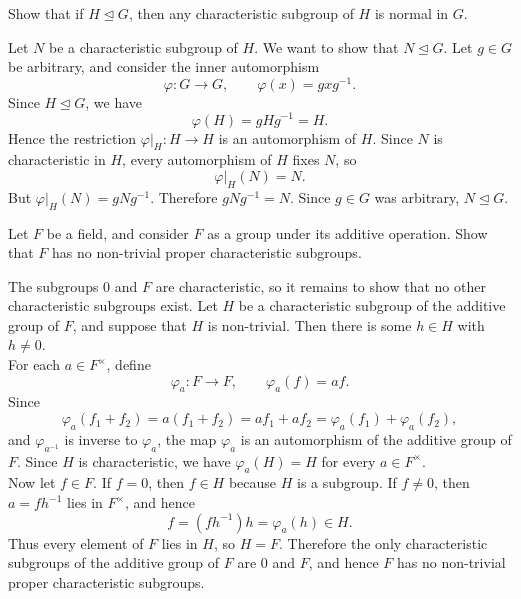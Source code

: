 \documentclass[../Odyssey_Project.tex]{subfiles}
\begin{document}
\begin{exercise}
\label{ex:2.4}
Show that if $H \trianglelefteq G$, then any characteristic subgroup of $H$ is normal in $G$.
\end{exercise}
\begin{solution}
    Let $N$ be a characteristic subgroup of $H$. We want to show that $N \trianglelefteq G$. Let $g \in G$ be arbitrary, and consider the inner automorphism
    \[
        \varphi \colon G \to G,
        \qquad
        \varphi(x) = gxg^{-1}.
    \]
    Since $H \trianglelefteq G$, we have
    \[
        \varphi(H) = gHg^{-1} = H.
    \]
    Hence the restriction $\varphi|_H \colon H \to H$ is an automorphism of $H$. Since $N$ is characteristic in $H$, every automorphism of $H$ fixes $N$, so
    \[
        \varphi|_H(N) = N.
    \]
    But $\varphi|_H(N) = gNg^{-1}$. Therefore $gNg^{-1} = N$. Since $g \in G$ was arbitrary, $N \trianglelefteq G$.
\end{solution}

\begin{exercise}
\label{ex:2.5}
Let $F$ be a field, and consider $F$ as a group under its additive operation. Show that $F$ has no non-trivial proper characteristic subgroups.
\end{exercise}
\begin{solution}
    The subgroups $0$ and $F$ are characteristic, so it remains to show that no other characteristic subgroups exist. Let $H$ be a characteristic subgroup of the additive group of $F$, and suppose that $H$ is non-trivial. Then there is some $h \in H$ with $h \neq 0$. \\
    For each $a \in F^{\times}$, define
    \[
        \varphi_a \colon F \to F,
        \qquad
        \varphi_a(f) = af.
    \]
    Since
    \[
        \varphi_a(f_1+f_2) = a(f_1+f_2) = af_1+af_2 = \varphi_a(f_1)+\varphi_a(f_2),
    \]
    and $\varphi_{a^{-1}}$ is inverse to $\varphi_a$, the map $\varphi_a$ is an automorphism of the additive group of $F$. Since $H$ is characteristic, we have $\varphi_a(H) = H$ for every $a \in F^{\times}$. \\
    Now let $f \in F$. If $f = 0$, then $f \in H$ because $H$ is a subgroup. If $f \neq 0$, then $a = fh^{-1}$ lies in $F^{\times}$, and hence
    \[
        f = (fh^{-1})h = \varphi_a(h) \in H.
    \]
    Thus every element of $F$ lies in $H$, so $H = F$. Therefore the only characteristic subgroups of the additive group of $F$ are $0$ and $F$, and hence $F$ has no non-trivial proper characteristic subgroups.
\end{solution}
\end{document}
